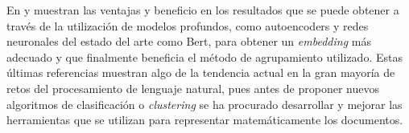 En \cite{DeepRepresentationClusteringTweets} y \cite{UnsupervisedDeepEmbeddingClustering} muestran las ventajas y beneficio en los resultados que se puede obtener a través de la utilización de modelos profundos, como autoencoders y redes neuronales del estado del arte como Bert, para obtener un \textit{embedding} más adecuado y que finalmente beneficia el método de agrupamiento utilizado. Estas últimas referencias muestran algo de la tendencia actual en la gran mayoría de retos del procesamiento de lenguaje natural, pues antes de proponer nuevos algoritmos de clasificación o \textit{clustering} se ha procurado desarrollar y mejorar las herramientas que se utilizan para representar matemáticamente los documentos.